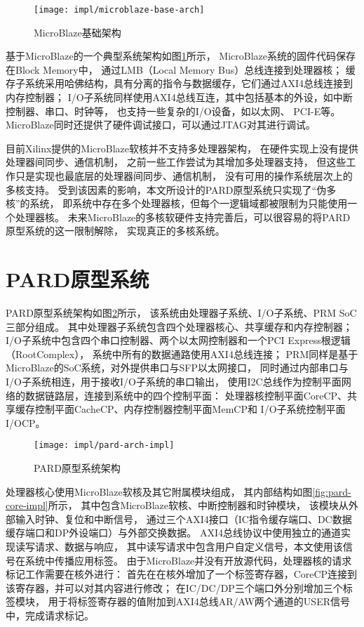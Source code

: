 \begin{figure}[tb]
  \centering
  \texttt{[image: impl/microblaze-base-arch]}
  \caption{MicroBlaze基础架构}
  \label{fig:microblaze-base-arch}
\end{figure}


基于MicroBlaze的一个典型系统架构如图\ref{fig:microblaze-base-arch}所示，
MicroBlaze系统的固件代码保存在Block Memory中，
通过LMB（Local Memory Bus）总线连接到处理器核；
缓存子系统采用哈佛结构，具有分离的指令与数据缓存，它们通过AXI4总线连接到内存控制器；
I/O子系统同样使用AXI4总线互连，其中包括基本的外设，如中断控制器、串口、时钟等，
也支持一些复杂的I/O设备，如以太网\cite{axi-ethernet-subsystem}、
PCI-E\cite{axi-pcie-bridge}等。
MicroBlaze同时还提供了硬件调试接口，可以通过JTAG对其进行调试。

目前Xilinx提供的MicroBlaze软核并不支持多处理器架构，
在硬件实现上没有提供处理器间同步、通信机制，
之前一些工作\cite{microblaze-mp-rsp08,microblaze-mp-xapp}尝试为其增加多处理器支持，
但这些工作只是实现也最底层的处理器间同步、通信机制，
没有可用的操作系统层次上的多核支持。
受到该因素的影响，本文所设计的PARD原型系统只实现了``伪多核''的系统，
即系统中存在多个处理器核，但每个一逻辑域都被限制为只能使用一个处理器核。
未来MicroBlaze的多核软硬件支持完善后，可以很容易的将PARD原型系统的这一限制解除，
实现真正的多核系统。


\section{PARD原型系统}

PARD原型系统架构如图\ref{fig:pard-arch-impl}所示，
该系统由处理器子系统、I/O子系统、PRM SoC三部分组成。
其中处理器子系统包含四个处理器核心、共享缓存和内存控制器；
I/O子系统中包含四个串口控制器、两个以太网控制器和一个PCI Express根逻辑（RootComplex），
系统中所有的数据通路使用AXI4总线连接；
PRM同样是基于MicroBlaze的SoC系统，对外提供串口与SFP以太网接口，
同时通过内部串口与I/O子系统相连，用于接收I/O子系统的串口输出，
使用I2C总线作为控制平面网络的数据链路层，连接到系统中的四个控制平面：
处理器核控制平面CoreCP、共享缓存控制平面CacheCP、内存控制器控制平面MemCP和
I/O子系统控制平面I/OCP。

\begin{figure}[tb]
  \centering
  \texttt{[image: impl/pard-arch-impl]}
  \caption{PARD原型系统架构}
  \label{fig:pard-arch-impl}
\end{figure}

处理器核心使用MicroBlaze软核及其它附属模块组成，
其内部结构如图\ref{fig:pard-core-impl}所示，
其中包含MicroBlaze软核、中断控制器和时钟模块，
该模块从外部输入时钟、复位和中断信号，
通过三个AXI4接口（IC指令缓存端口、DC数据缓存端口和DP外设端口）与外部交换数据。
AXI4总线协议中使用独立的通道实现读写请求、数据与响应，
其中读写请求中包含用户自定义信号，本文使用该信号在系统中传播应用标签。
由于MicroBlaze并没有开放源代码，处理器核的请求标记工作需要在核外进行：
首先在在核外增加了一个标签寄存器，CoreCP连接到该寄存器，并可以对其内容进行修改；
在IC/DC/DP三个端口外分别增加三个标签模块，
用于将标签寄存器的值附加到AXI4总线AR/AW两个通道的USER信号中，完成请求标记。

